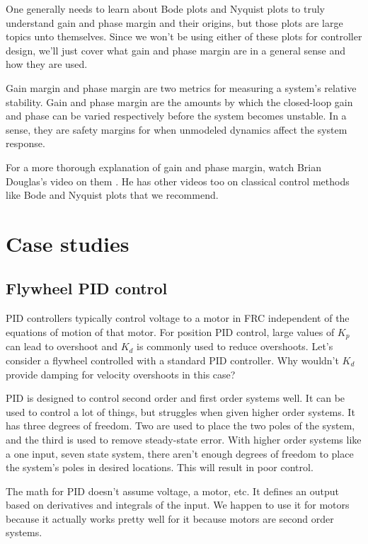 One generally needs to learn about Bode plots and Nyquist plots to truly
understand gain and phase margin and their origins, but those plots are large
topics unto themselves. Since we won't be using either of these plots for
controller design, we'll just cover what gain and phase margin are in a general
sense and how they are used.

Gain margin and phase margin are two metrics for measuring a system's relative
stability. Gain and phase margin are the amounts by which the closed-loop gain
and phase can be varied respectively before the system becomes unstable. In a
sense, they are safety margins for when unmodeled dynamics affect the system
response.

For a more thorough explanation of gain and phase margin, watch Brian Douglas's
video on them \cite{bib:gain_phase_margin}. He has other videos too on classical
control methods like Bode and Nyquist plots that we recommend.

\section{Case studies}

\subsection{Flywheel PID control}

PID controllers typically control voltage to a motor in FRC independent of the
equations of motion of that motor. For position PID control, large values of
$K_p$ can lead to overshoot and $K_d$ is commonly used to reduce overshoots.
Let's consider a flywheel controlled with a standard PID controller. Why
wouldn't $K_d$ provide damping for velocity overshoots in this case?

PID is designed to control second order and first order systems well. It can be
used to control a lot of things, but struggles when given higher order systems.
It has three degrees of freedom. Two are used to place the two poles of the
system, and the third is used to remove steady-state error. With higher order
systems like a one input, seven state system, there aren't enough degrees of
freedom to place the system's poles in desired locations. This will result in
poor control.

The math for PID doesn't assume voltage, a motor, etc. It defines an output
based on derivatives and integrals of the input. We happen to use it for motors
because it actually works pretty well for it because motors are second order
systems.

